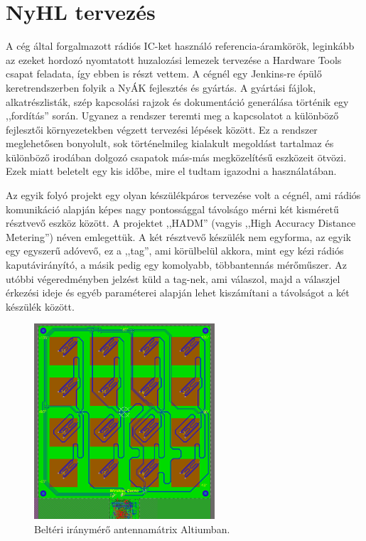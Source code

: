    \section{NyHL tervezés}
        A cég által forgalmazott rádiós IC-ket használó referencia-áramkörök, leginkább az ezeket hordozó nyomtatott huzalozási lemezek tervezése a Hardware Tools csapat feladata, így ebben is részt vettem. A cégnél egy Jenkins-re \cite{Jenkins} épülő keretrendszerben folyik a NyÁK fejlesztés és gyártás. A gyártási fájlok, alkatrészlisták, szép kapcsolási rajzok és dokumentáció generálása történik egy ,,fordítás'' során. Ugyanez a rendszer teremti meg a kapcsolatot a különböző fejlesztői környezetekben végzett tervezési lépések között. Ez a rendszer meglehetősen bonyolult, sok történelmileg kialakult megoldást tartalmaz és különböző irodában dolgozó csapatok más-más megközelítésű eszközeit ötvözi. Ezek miatt beletelt egy kis időbe, mire el tudtam igazodni a használatában.
        \par
        Az egyik folyó projekt egy olyan készülékpáros tervezése volt a cégnél, ami rádiós komunikáció alapján képes nagy pontossággal távolságo mérni két kisméretű résztvevő eszköz között. A projektet ,,HADM'' (vagyis ,,High Accuracy Distance Metering'') néven emlegettük. A két résztvevő készülék nem egyforma, az egyik egy egyszerű adóvevő, ez a ,,tag'', ami körülbelül akkora, mint egy kézi rádiós kaputávirányító, a másik pedig egy komolyabb, többantennás mérőműszer. Az utóbbi végeredményben jelzést küld a tag-nek, ami válaszol, majd a válaszjel érkezési ideje és egyéb paraméterei alapján lehet kiszámítani a távolságot a két készülék között.
            \begin{figure}
                \centering
                \includegraphics[width=0.6\textwidth]{kep/szerkesztett/antennamatrix.png}
                \caption{Beltéri iránymérő antennamátrix Altiumban.}
                \label{fig:antennamatrix}
            \end{figure}
